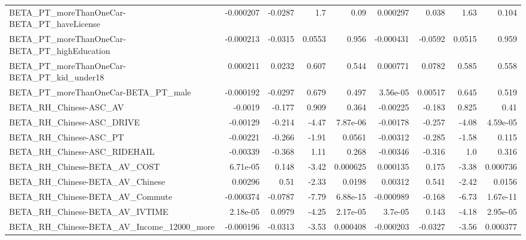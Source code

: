 \begin{tabular}{lrrrrrrrr}
BETA\_PT\_moreThanOneCar-BETA\_PT\_haveLicense         &   -0.000207 &      -0.0287 &       1.7 &     0.09 &   0.000297 &       0.038 &         1.63 &         0.104 \\
BETA\_PT\_moreThanOneCar-BETA\_PT\_highEducation       &   -0.000213 &      -0.0315 &    0.0553 &    0.956 &  -0.000431 &     -0.0592 &       0.0515 &         0.959 \\
BETA\_PT\_moreThanOneCar-BETA\_PT\_kid\_under18         &    0.000211 &       0.0232 &     0.607 &    0.544 &   0.000771 &      0.0782 &        0.585 &         0.558 \\
BETA\_PT\_moreThanOneCar-BETA\_PT\_male                &   -0.000192 &      -0.0297 &     0.679 &    0.497 &   3.56e-05 &     0.00517 &        0.645 &         0.519 \\
BETA\_RH\_Chinese-ASC\_AV                             &     -0.0019 &       -0.177 &     0.909 &    0.364 &   -0.00225 &      -0.183 &        0.825 &          0.41 \\
BETA\_RH\_Chinese-ASC\_DRIVE                          &    -0.00129 &       -0.214 &     -4.47 & 7.87e-06 &   -0.00178 &      -0.257 &        -4.08 &      4.59e-05 \\
BETA\_RH\_Chinese-ASC\_PT                             &    -0.00221 &       -0.266 &     -1.91 &   0.0561 &   -0.00312 &      -0.285 &        -1.58 &         0.115 \\
BETA\_RH\_Chinese-ASC\_RIDEHAIL                       &    -0.00339 &       -0.368 &      1.11 &    0.268 &   -0.00346 &      -0.316 &          1.0 &         0.316 \\
BETA\_RH\_Chinese-BETA\_AV\_COST                       &    6.71e-05 &        0.148 &     -3.42 & 0.000625 &   0.000135 &       0.175 &        -3.38 &      0.000736 \\
BETA\_RH\_Chinese-BETA\_AV\_Chinese                    &     0.00296 &         0.51 &     -2.33 &   0.0198 &    0.00312 &       0.541 &        -2.42 &        0.0156 \\
BETA\_RH\_Chinese-BETA\_AV\_Commute                    &   -0.000374 &      -0.0787 &     -7.79 & 6.88e-15 &  -0.000989 &      -0.168 &        -6.73 &      1.67e-11 \\
BETA\_RH\_Chinese-BETA\_AV\_IVTIME                     &    2.18e-05 &       0.0979 &     -4.25 & 2.17e-05 &    3.7e-05 &       0.143 &        -4.18 &      2.95e-05 \\
BETA\_RH\_Chinese-BETA\_AV\_Income\_12000\_more          &   -0.000196 &      -0.0313 &     -3.53 & 0.000408 &  -0.000203 &     -0.0327 &        -3.56 &      0.000377 \\

\end{tabular}
